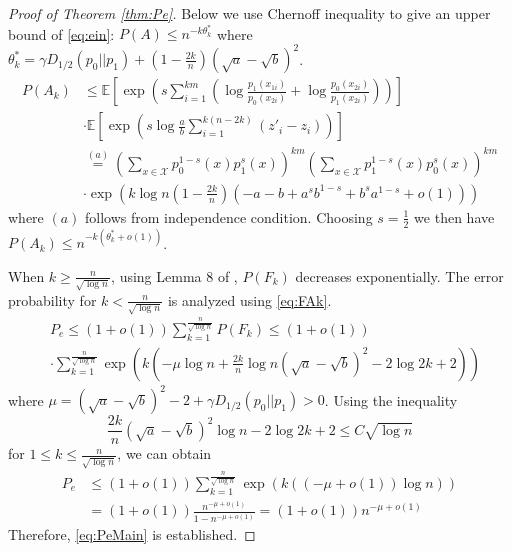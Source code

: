 \documentclass[conference]{IEEEtran}
\begin{document}
\begin{proof}[Proof of Theorem \ref{thm:Pe}]
Below we use Chernoff inequality to give an upper bound of \eqref{eq:ein}:
$P(A) \leq n^{-k\theta^*_k}$ where $\theta^*_k=\gamma D_{1/2}(p_0||p_1)+(1-\frac{2k}{n})(\sqrt{a}-\sqrt{b})^2$.
\begin{align*}
P(A_k) &\leq \mathbb{E}[\exp \left( s\sum_{i=1}^{km}
\left( \log \frac{p_1(x_{1i})}{p_0(x_{2i})}
+ \log \frac{p_0(x_{2i})}{p_1(x_{2i})} \right) \right)]\\
& \cdot \mathbb{E}[\exp\left(s\log \frac{a}{b}\sum_{i=1}^{k(n-2k)} (z'_i - z_i )\right)] \\
& \stackrel{(a)}{=} (\sum_{x\in \mathcal{X}} p_0^{1-s}(x)p_1^{s}(x))^{km} (\sum_{x\in \mathcal{X}} p_1^{1-s}(x)p_0^{s}(x))^{km} \\
& \cdot \exp (k\log n (1-\frac{2k}{n})(-a-b+a^sb^{1-s}+b^sa^{1-s} +o(1)) )
\end{align*}
where $(a)$ follows from independence condition. Choosing $s=\frac{1}{2}$ we then have 
$P(A_k) \leq  n^{-k(\theta^*_k+o(1))}$.

When $k \geq \frac{n}{\sqrt{\log n}}$, using Lemma 8 of \cite{feng2021},
$P(F_k)$ decreases exponentially. The error probability for $k < \frac{n}{\sqrt{\log n}}$
is analyzed using \eqref{eq:FAk}.
\begin{align*}
&P_e \leq (1+o(1))\sum_{k=1}^{\frac{n}{\sqrt{\log n}}} P(F_k) \leq (1+o(1))\\
& \cdot \sum_{k=1}^{\frac{n}{\sqrt{\log n}}} \exp(k(-\mu \log n + \frac{2k}{n} \log n(\sqrt{a} - \sqrt{b})^2 - 2\log 2k + 2))
\end{align*}
where $\mu = (\sqrt{a} - \sqrt{b})^2-2 + \gamma D_{1/2}(p_0||p_1) > 0$.
Using the inequality
$$
\frac{2k}{n}(\sqrt{a} - \sqrt{b})^2\log n -2\log2k+2\leq  C\sqrt{\log n}
$$
for $1\leq k \leq \frac{n}{\sqrt{\log n}}$, we can obtain
\begin{align*}
P_e &\leq(1+o(1)) \sum_{k=1}^{\frac{n}{\sqrt{\log n}}} \exp(k((-\mu + o(1)) \log n )) \\
& =(1+o(1)) \frac{n^{-\mu + o(1)}}{1-n^{-\mu + o(1)}} = (1+o(1))n^{-\mu + o(1)}
\end{align*}
Therefore, \eqref{eq:PeMain} is established.


\end{proof}
\end{document}
